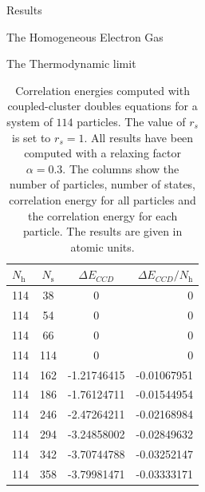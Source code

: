 \documentclass[twoside,english]{uiofysmaster}
\begin{document}
\begin{chapter}{Results}
\begin{section}{The Homogeneous Electron Gas}
\begin{subsection}{The Thermodynamic limit}
			\begin{table}[H]
				\begin{center}
					\begin{tabular}[center]{l  c  c r}
						$N_{\text{h}}$ & $N_{\text{s}}$ & $\Delta E_{CCD}$ & $\Delta E_{CCD}/N_{\text{h}}$ \\
						\hline
						114 &  38 & 0 &0\\
						114 &  54 & 0 &0\\
						114 &  66 & 0 &0\\
						114 & 114 & 0 &0\\
						114 & 162 & -1.21746415 & -0.01067951 \\
						114 & 186 & -1.76124711 & -0.01544954 \\
						114 & 246 & -2.47264211 & -0.02168984 \\
						114 & 294 & -3.24858002 & -0.02849632 \\
						114 & 342 & -3.70744788 & -0.03252147 \\
						114 & 358 & -3.79981471 & -0.03333171
					\end{tabular}
				\end{center}
				\caption{Correlation energies computed with coupled-cluster doubles equations for a system of $114$ particles. The value of $r_s$ is set to $r_s=1$. All results have been computed with a relaxing factor $\alpha=0.3$. The columns show the number of particles, number of states, correlation energy for all particles and the correlation energy for each particle. The results are given in atomic units.}
				\label{table:ThermodynamicLimit5}
			\end{table}
		\end{subsection}
	\end{section}


\end{chapter}
\end{document}
